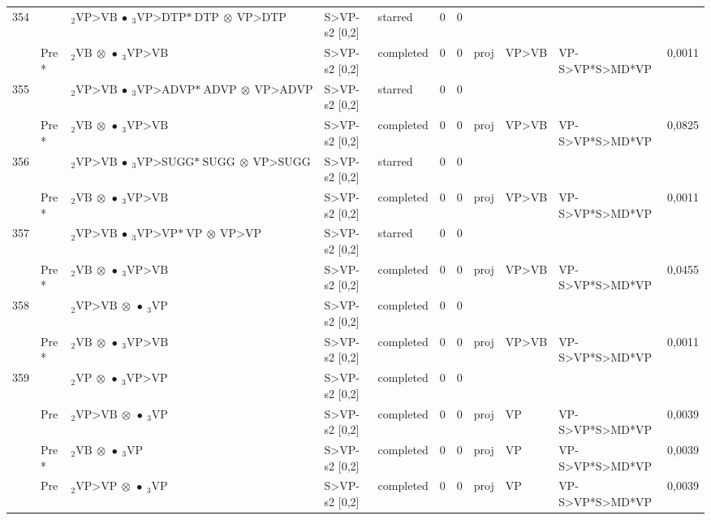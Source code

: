 \documentclass[10pt]{article}
\begin{document}
\begin{longtable}[htbp]{lllllllllll}
354 & & $ {}_2 \textrm{VP>VB} \  \bullet \ {}_{3} \textrm{VP>DTP*} \ \textrm{DTP} \  \otimes \ \textrm{VP>DTP} $ & S>VP-s2 [0,2] & starred & 0 & 0 & & & & \\ 
 & Pre *& $ {}_2 \textrm{VB} \  \otimes \  \bullet \ {}_{3} \textrm{VP>VB} $ & S>VP-s2 [0,2] & completed & 0 & 0 & proj & VP>VB & VP-S>VP*S>MD*VP & 0,0011 \\ 
355 & & $ {}_2 \textrm{VP>VB} \  \bullet \ {}_{3} \textrm{VP>ADVP*} \ \textrm{ADVP} \  \otimes \ \textrm{VP>ADVP} $ & S>VP-s2 [0,2] & starred & 0 & 0 & & & & \\ 
 & Pre *& $ {}_2 \textrm{VB} \  \otimes \  \bullet \ {}_{3} \textrm{VP>VB} $ & S>VP-s2 [0,2] & completed & 0 & 0 & proj & VP>VB & VP-S>VP*S>MD*VP & 0,0825 \\ 
356 & & $ {}_2 \textrm{VP>VB} \  \bullet \ {}_{3} \textrm{VP>SUGG*} \ \textrm{SUGG} \  \otimes \ \textrm{VP>SUGG} $ & S>VP-s2 [0,2] & starred & 0 & 0 & & & & \\ 
 & Pre *& $ {}_2 \textrm{VB} \  \otimes \  \bullet \ {}_{3} \textrm{VP>VB} $ & S>VP-s2 [0,2] & completed & 0 & 0 & proj & VP>VB & VP-S>VP*S>MD*VP & 0,0011 \\ 
357 & & $ {}_2 \textrm{VP>VB} \  \bullet \ {}_{3} \textrm{VP>VP*} \ \textrm{VP} \  \otimes \ \textrm{VP>VP} $ & S>VP-s2 [0,2] & starred & 0 & 0 & & & & \\ 
 & Pre *& $ {}_2 \textrm{VB} \  \otimes \  \bullet \ {}_{3} \textrm{VP>VB} $ & S>VP-s2 [0,2] & completed & 0 & 0 & proj & VP>VB & VP-S>VP*S>MD*VP & 0,0455 \\ 
358 & & $ {}_2 \textrm{VP>VB} \  \otimes \  \bullet \ {}_{3} \textrm{VP} $ & S>VP-s2 [0,2] & completed & 0 & 0 & & & & \\ 
 & Pre *& $ {}_2 \textrm{VB} \  \otimes \  \bullet \ {}_{3} \textrm{VP>VB} $ & S>VP-s2 [0,2] & completed & 0 & 0 & proj & VP>VB & VP-S>VP*S>MD*VP & 0,0011 \\ 
359 & & $ {}_2 \textrm{VP} \  \otimes \  \bullet \ {}_{3} \textrm{VP>VP} $ & S>VP-s2 [0,2] & completed & 0 & 0 & & & & \\ 
 & Pre & $ {}_2 \textrm{VP>VB} \  \otimes \  \bullet \ {}_{3} \textrm{VP} $ & S>VP-s2 [0,2] & completed & 0 & 0 & proj & VP & VP-S>VP*S>MD*VP & 0,0039 \\ 
 & Pre *& $ {}_2 \textrm{VB} \  \otimes \  \bullet \ {}_{3} \textrm{VP} $ & S>VP-s2 [0,2] & completed & 0 & 0 & proj & VP & VP-S>VP*S>MD*VP & 0,0039 \\ 
 & Pre & $ {}_2 \textrm{VP>VP} \  \otimes \  \bullet \ {}_{3} \textrm{VP} $ & S>VP-s2 [0,2] & completed & 0 & 0 & proj & VP & VP-S>VP*S>MD*VP & 0,0039 \\ 

\end{longtable}
\end{document}
